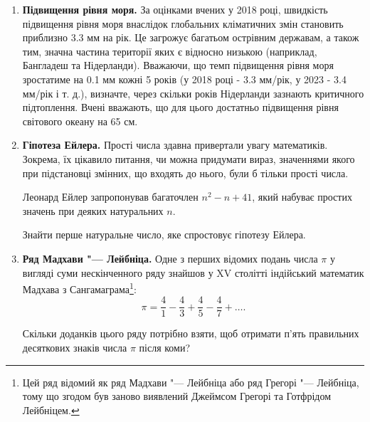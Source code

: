 \begin{enumerate}
\item \textbf{Підвищення рівня моря.} За оцінками вчених у 2018 році, швидкість підвищення рівня моря внаслідок глобальних кліматичних змін становить приблизно 3.3 мм на рік. Це загрожує багатьом острівним державам, а також тим, значна частина території яких є відносно низькою (наприклад, Бангладеш та Нідерланди). Вважаючи, що темп підвищення рівня моря зростатиме на 0.1 мм кожні 5 років (у 2018 році - 3.3 мм/рік, у 2023 - 3.4 мм/рік і т. д.), визначте, через скільки років Нідерланди зазнають критичного підтоплення. Вчені вважають, що для цього достатньо підвищення рівня світового океану на 65 см.
\item \textbf{Гіпотеза Ейлера.} Прості числа здавна привертали увагу математиків. Зокрема, їх цікавило питання, чи можна придумати вираз, значеннями якого при підстановці змінних, що входять до нього, були б тільки прості числа.

Леонард Ейлер запропонував багаточлен $n^2-n+41$, який набуває простих значень при деяких натуральних $n$.

Знайти перше натуральне число, яке спростовує гіпотезу Ейлера.
\item \textbf{Ряд Мадхави "--- Лейбніца.} Одне з перших відомих подань числа $\pi$ у вигляді суми нескінченного ряду знайшов у XV столітті індійський математик Мадхава з Сангамаграма\footnote[1]{Цей ряд відомий як ряд Мадхави "--- Лейбніца або ряд Грегорі "--- Лейбніца, тому що згодом був заново виявлений Джеймсом Грегорі та Готфрідом Лейбніцем.}:
$$
\pi=\frac{4}{1}-\frac{4}{3}+\frac{4}{5}-\frac{4}{7}+\ldots.
$$

Скільки доданків цього ряду потрібно взяти, щоб отримати п'ять правильних десяткових знаків числа $\pi$ після коми?
\end{enumerate}





